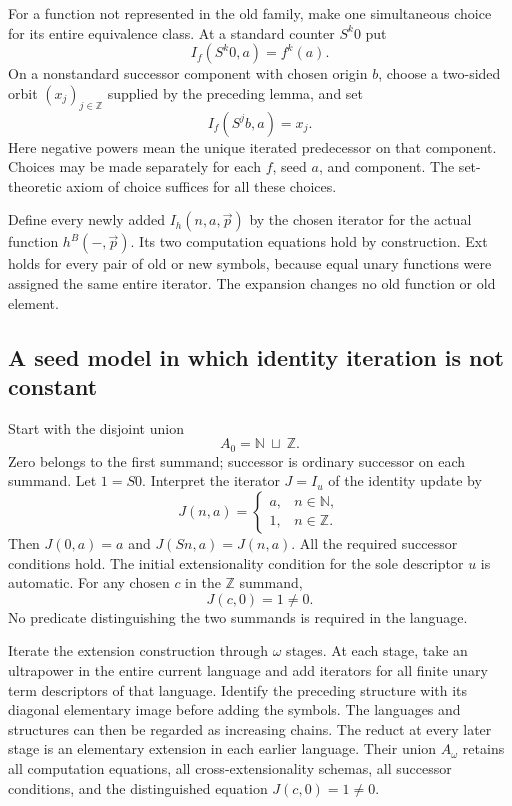 \documentclass[11pt,letterpaper]{article}
\theoremstyle{definition}
\begin{document}
For a function not represented in the old family, make one simultaneous
choice for its entire equivalence class. At a standard counter $S^k0$ put
\[
                         I_f(S^k0,a)=f^k(a).
\]
On a nonstandard successor component with chosen origin $b$, choose a
two-sided orbit $(x_j)_{j\in\mathbb Z}$ supplied by the preceding lemma,
and set
\[
                         I_f(S^j b,a)=x_j.
\]
Here negative powers mean the unique iterated predecessor on that component.
Choices may be made separately for each $f$, seed $a$, and component.
The set-theoretic axiom of choice suffices for all these choices.

Define every newly added $I_h(n,a,\vec p)$ by the chosen iterator for the
actual function $h^B(-,\vec p)$. Its two computation equations hold by
construction. Ext holds for every pair of old or new symbols, because
equal unary functions were assigned the same entire iterator. The expansion
changes no old function or old element.

\subsection{A seed model in which identity iteration is not constant}

Start with the disjoint union
\[
                         A_0=\mathbb N\ \sqcup\ \mathbb Z.
\]
Zero belongs to the first summand; successor is ordinary successor on each
summand. Let $1=S0$. Interpret the iterator $J=I_u$ of the identity update by
\[
 J(n,a)=
 \begin{cases}
 a,&n\in\mathbb N,\\
 1,&n\in\mathbb Z.
 \end{cases}
\]
Then $J(0,a)=a$ and $J(Sn,a)=J(n,a)$. All the required successor conditions
hold. The initial extensionality condition for the sole descriptor $u$ is
automatic. For any chosen $c$ in the $\mathbb Z$ summand,
\[
                           J(c,0)=1\ne0.
\]
No predicate distinguishing the two summands is required in the language.

Iterate the extension construction through $\omega$ stages. At each stage,
take an ultrapower in the entire current language and add iterators for all
finite unary term descriptors of that language. Identify the preceding
structure with its diagonal elementary image before adding the symbols.
The languages and structures can then be regarded as increasing chains.
The reduct at every later stage is an elementary extension in each earlier
language. Their union $A_\omega$ retains all computation equations, all
cross-extensionality schemas, all successor conditions, and the distinguished
equation $J(c,0)=1\ne0$.
\end{document}
